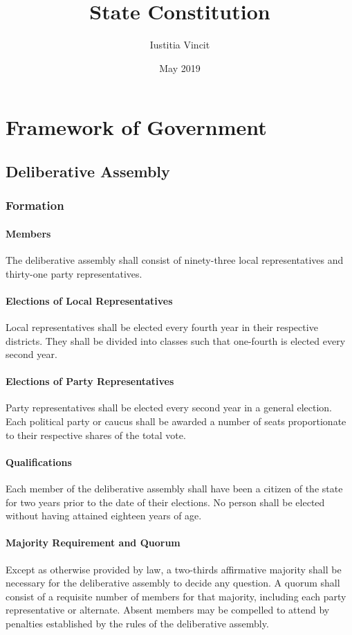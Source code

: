 \documentclass{article}
\title{State Constitution}
\date{May 2019}
\author{Iustitia Vincit}
\begin{document}
\maketitle
\newpage
\tableofcontents
\newpage
\section{Framework of Government}
\subsection{Deliberative Assembly}
\subsubsection{Formation}
\paragraph{Members}
The deliberative assembly shall consist of ninety-three local representatives and thirty-one party representatives.
\paragraph{Elections of Local Representatives}
Local representatives shall be elected every fourth year in their respective districts. They shall be divided into classes such that one-fourth is elected every second year.
\paragraph{Elections of Party Representatives}
Party representatives shall be elected every second year in a general election. Each political party or caucus shall be awarded a number of seats proportionate to their respective shares of the total vote.
\paragraph{Qualifications}
Each member of the deliberative assembly shall have been a citizen of the state for two years prior to the date of their elections. No person shall be elected without having attained eighteen years of age.
\paragraph{Majority Requirement and Quorum}
Except as otherwise provided by law, a two-thirds affirmative majority shall be necessary for the deliberative assembly to decide any question. A quorum shall consist of a requisite number of members for that majority, including each party representative or alternate. Absent members may be compelled to attend by penalties established by the rules of the deliberative assembly.
\end{document}
